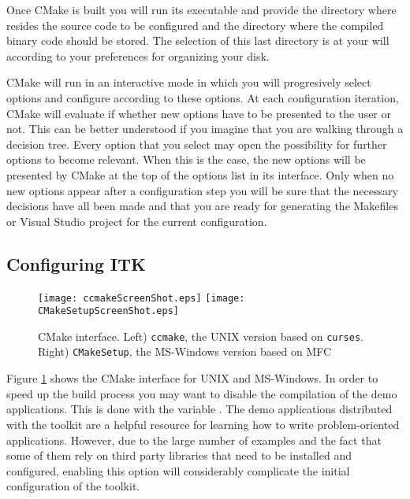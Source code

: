 Once CMake is built you will run its executable and provide the directory
where resides the source code to be configured and the directory where the
compiled binary code should be stored. The selection of this last directory
is at your will according to your preferences for organizing your disk.

CMake will run in an interactive mode in which you will progresively select
options and configure according to these options. At each configuration
iteration, CMake will evaluate if whether new options have to be presented to
the user or not. This can be better understood if you imagine that you are
walking through a decision tree.  Every option that you select may open the
possibility for further options to become relevant. When this is the case,
the new options will be presented by CMake at the top of the options list in
its interface.  Only when no new options appear after a configuration step
you will be sure that the necessary decisions have all been made and that you
are ready for generating the Makefiles or Visual Studio project for the
current configuration.

\subsection{Configuring ITK}
\label{sec:ConfiguringITKwithVTK}
  

\begin{figure}[ht]
\centering 
\texttt{[image: ccmakeScreenShot.eps]}
\texttt{[image: CMakeSetupScreenShot.eps]}
\caption{CMake interface. Left) \texttt{ccmake}, the UNIX version based on
\texttt{curses}. Right) \texttt{CMakeSetup}, the MS-Windows version based on MFC}
\label{fig:CMakeGUI}
\end{figure}

Figure \ref{fig:CMakeGUI} shows the CMake interface for UNIX and MS-Windows.
In order to speed up the build process you may want to disable the
compilation of the demo applications. This is done with the variable
. The demo applications  distributed with the
toolkit are a helpful resource for learning how to write problem-oriented
applications.  However, due to the large number of examples and the fact that
some of them rely on third party libraries that need to be installed and
configured, enabling this option will considerably complicate the initial
configuration of the toolkit.

